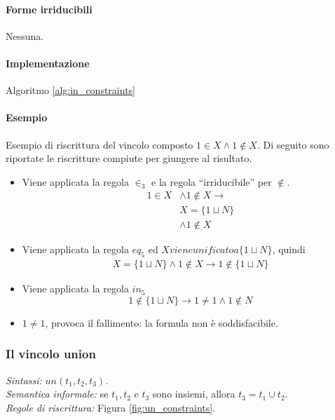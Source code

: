 \documentclass[12pt,a4paper,openright]{book}  %
\begin{document}
\paragraph{Forme irriducibili} Nessuna.

\paragraph{Implementazione}
Algoritmo \ref{alg:in_constraints}

\paragraph{Esempio}
Esempio di riscrittura del vincolo composto $1 \in X \land 1 \not\in
X$. Di seguito sono riportate le riscritture compiute per giungere al
risultato.

\begin{itemize}
	\item Viene applicata la regola $\in_3$ e la regola
          ``irriducibile'' per $\not\in$.\\
	  \[
	  \begin{split}
	    1 \in X &\land 1 \not\in X \to \\ & X = \{ 1 \sqcup N \}
              \\ & \land 1 \not\in X
	  \end{split}
	  \]
	\item Viene applicata la regola $eq_5$ ed $X viene unificato a
          \{ 1 \sqcup N\}$, quindi
	  \[
	    \begin{split}
	      X = \{ 1 \sqcup N \} \land 1 \not\in X \to 1 \not\in \{1 \sqcup N\}
	    \end{split}
	  \]
	\item Viene applicata la regola $in_5$
	  \[
	    1 \not\in \{1 \sqcup N\} \to 1 \neq 1 \land 1 \not\in N
	  \]
	\item $1 \neq 1$, provoca il fallimento: la formula non è
          soddisfacibile.
\end{itemize}

\subsubsection{Il vincolo union}

\textit{Sintassi:} $un(t_1, t_2, t_3)$.\\
\noindent\textit{Semantica informale:} se $t_1, t_2$ e $t_3$ sono insiemi,  allora $t_3 = t_1 \cup t_2$.\\
\noindent\textit{Regole di riscrittura:} Figura \ref{fig:un_constraints}.
\end{document}
